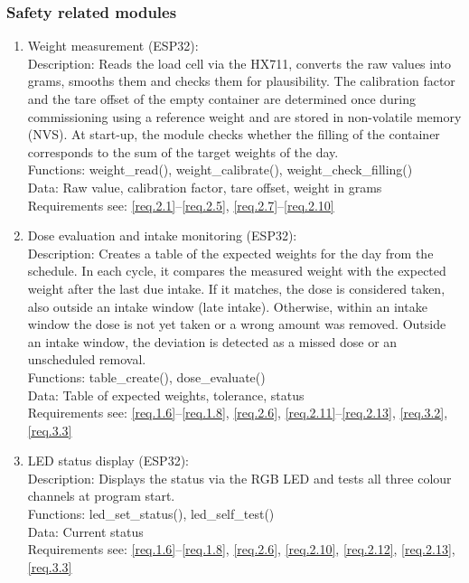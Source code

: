 \subsubsection{Safety related modules}
	\begin{enumerate}
		\item Weight measurement (ESP32): \\
			Description: Reads the load cell via the HX711, converts the raw
			values into grams, smooths them and checks them for plausibility.
			The calibration factor and the tare offset of the empty container
			are determined once during commissioning using a reference weight
			and are stored in non-volatile memory (NVS). At start-up, the
			module checks whether the filling of the container corresponds to
			the sum of the target weights of the day. \\
			Functions: weight\_read(), weight\_calibrate(),
			weight\_check\_filling() \\
			Data: Raw value, calibration factor, tare offset, weight in grams \\
			Requirements see: \ref{req.2.1}--\ref{req.2.5}, \ref{req.2.7}--\ref{req.2.10}

		\item Dose evaluation and intake monitoring (ESP32): \\
			Description: Creates a table of the expected weights for the day
			from the schedule. In each cycle, it compares the measured weight
			with the expected weight after the last due intake. If it matches,
			the dose is considered taken, also outside an intake window (late
			intake). Otherwise, within an intake window the dose is not yet
			taken or a wrong amount was removed. Outside an intake window, the
			deviation is detected as a missed dose or an unscheduled removal. \\
			Functions: table\_create(), dose\_evaluate() \\
			Data: Table of expected weights, tolerance, status \\
			Requirements see: \ref{req.1.6}--\ref{req.1.8}, \ref{req.2.6}, \ref{req.2.11}--\ref{req.2.13}, \ref{req.3.2}, \ref{req.3.3}

		\item LED status display (ESP32): \\
			Description: Displays the status via the RGB LED and tests all
			three colour channels at program start. \\
			Functions: led\_set\_status(), led\_self\_test() \\
			Data: Current status \\
			Requirements see: \ref{req.1.6}--\ref{req.1.8}, \ref{req.2.6}, \ref{req.2.10}, \ref{req.2.12}, \ref{req.2.13}, \ref{req.3.3}


\end{enumerate}
